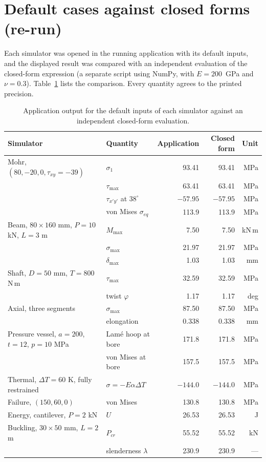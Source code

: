 \section{Default cases against closed forms (re-run)}
\label{sec:defaults}
Each simulator was opened in the running application with its default inputs, and the displayed result was compared with an independent evaluation of the closed-form expression (a separate script using NumPy, with $E=200$~GPa and $\nu=0.3$). Table~\ref{tab:defaults} lists the comparison. Every quantity agrees to the printed precision.

\begin{table}[H]\centering\small
\caption{Application output for the default inputs of each simulator against an independent closed-form evaluation.}\label{tab:defaults}
\begin{tabular}{@{}llrrr@{}}\toprule
Simulator & Quantity & Application & Closed form & Unit\\\midrule
Mohr, $(80,-20,0,\tau_{xy}=-39)$ & $\sigma_1$ & 93.41 & 93.41 & MPa\\
 & $\tau_{\max}$ & 63.41 & 63.41 & MPa\\
 & $\tau_{x'y'}$ at $38^\circ$ & $-57.95$ & $-57.95$ & MPa\\
 & von Mises $\sigma_{eq}$ & 113.9 & 113.9 & MPa\\
Beam, $80\times160$ mm, $P=10$ kN, $L=3$ m & $M_{\max}$ & 7.50 & 7.50 & kN\,m\\
 & $\sigma_{\max}$ & 21.97 & 21.97 & MPa\\
 & $\delta_{\max}$ & 1.03 & 1.03 & mm\\
Shaft, $D=50$ mm, $T=800$ N\,m & $\tau_{\max}$ & 32.59 & 32.59 & MPa\\
 & twist $\varphi$ & 1.17 & 1.17 & deg\\
Axial, three segments & $\sigma_{\max}$ & 87.50 & 87.50 & MPa\\
 & elongation & 0.338 & 0.338 & mm\\
Pressure vessel, $a=200$, $t=12$, $p=10$ MPa & Lam\'e hoop at bore & 171.8 & 171.8 & MPa\\
 & von Mises at bore & 157.5 & 157.5 & MPa\\
Thermal, $\Delta T=60$ K, fully restrained & $\sigma=-E\alpha\Delta T$ & $-144.0$ & $-144.0$ & MPa\\
Failure, $(150,60,0)$ & von Mises & 130.8 & 130.8 & MPa\\
Energy, cantilever, $P=2$ kN & $U$ & 26.53 & 26.53 & J\\
Buckling, $30\times50$ mm, $L=2$ m & $P_{cr}$ & 55.52 & 55.52 & kN\\
 & slenderness $\lambda$ & 230.9 & 230.9 & ---\\\bottomrule
\end{tabular}
\end{table}

